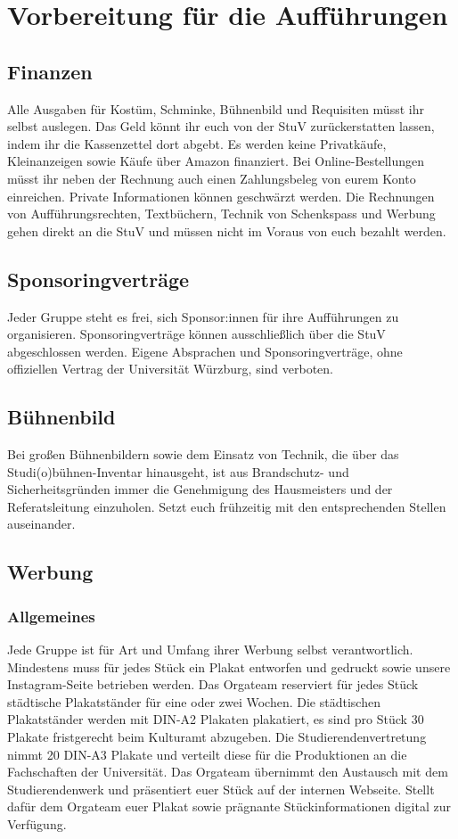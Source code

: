 \section{Vorbereitung für die Aufführungen}
\subsection{Finanzen}
Alle Ausgaben für Kostüm, Schminke, Bühnenbild und Requisiten müsst ihr selbst auslegen. Das Geld könnt ihr euch von der StuV zurückerstatten lassen, indem ihr die Kassenzettel dort abgebt. Es werden keine Privatkäufe, Kleinanzeigen sowie Käufe über Amazon finanziert.
Bei Online-Bestellungen müsst ihr neben der Rechnung auch einen Zahlungsbeleg von eurem Konto einreichen. Private Informationen können geschwärzt werden.
Die Rechnungen von Aufführungsrechten, Textbüchern, Technik von Schenkspass und Werbung gehen direkt an die StuV und müssen nicht im Voraus von euch bezahlt werden.	

\subsection{Sponsoringverträge}
Jeder Gruppe steht es frei, sich Sponsor:innen für ihre Aufführungen zu organisieren. Sponsoringverträge können ausschließlich über die StuV abgeschlossen werden. Eigene Absprachen und Sponsoringverträge, ohne offiziellen Vertrag der Universität Würzburg, sind verboten.

\subsection{Bühnenbild}
Bei großen Bühnenbildern sowie dem Einsatz von Technik, die über das Studi(o)bühnen-Inventar hinausgeht, ist aus Brandschutz- und Sicherheitsgründen immer die Genehmigung des Hausmeisters und der Referatsleitung einzuholen. Setzt euch frühzeitig mit den entsprechenden Stellen auseinander.	

\subsection{Werbung}
\subsubsection{Allgemeines}
Jede Gruppe ist für Art und Umfang ihrer Werbung selbst verantwortlich. Mindestens muss für jedes Stück ein Plakat entworfen und gedruckt sowie unsere Instagram-Seite betrieben werden.
Das Orgateam reserviert für jedes Stück städtische Plakatständer für eine oder zwei Wochen. Die städtischen Plakatständer werden mit DIN-A2 Plakaten plakatiert, es sind pro Stück 30 Plakate fristgerecht beim Kulturamt abzugeben. 
Die Studierendenvertretung nimmt 20 DIN-A3 Plakate und verteilt diese für die Produktionen an die Fachschaften der Universität. 
Das Orgateam übernimmt den Austausch mit dem Studierendenwerk und präsentiert euer Stück auf der internen Webseite. Stellt dafür dem Orgateam euer Plakat sowie prägnante Stückinformationen digital zur Verfügung. \\

